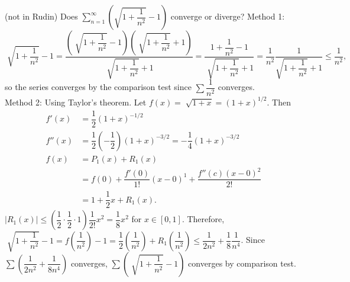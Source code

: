 \begin{example}
	(not in Rudin)
	Does $\sum_{n=1}^{\infty}{\left( \sqrt{1+\dfrac{1}{n^2}}-1 \right)}$ converge or diverge?
	Method 1:
	\[
		\sqrt[]{1+\dfrac{1}{n^2}}-1=\dfrac{\left(\sqrt[]{1+\dfrac{1}{n^2}}-1\right)\left(\sqrt[]{1+\dfrac{1}{n^2}}+1\right)}{\sqrt[]{1+\dfrac{1}{n^2}}+1}
		=\dfrac{1+\dfrac{1}{n^2}-1}{\sqrt[]{1+\dfrac{1}{n^2}}+1}=\dfrac{1}{n^2}\dfrac{1}{\sqrt{1+\dfrac{1}{n^2}}+1}\le \dfrac{1}{n^2}
		,\] so the series converges by the comparison test since $\sum{\dfrac{1}{n^2}}$ converges.\\
	Method 2: Using Taylor's theorem. Let $f(x)=\sqrt[]{1+x}=(1+x)^{1/2}$. Then
	\begin{align*}
		f'(x)  & =\dfrac{1}{2}(1+x)^{-1/2}                                            \\
		f''(x) & =\dfrac{1}{2}(-\dfrac{1}{2})(1+x)^{-3/2}  =-\dfrac{1}{4}(1+x)^{-3/2} \\
		f(x)   & =P_1(x)+R_1(x)                                                       \\
		       & =f(0)+\dfrac{f'(0)}{1!}(x-0)^{1}+\dfrac{f''(c)(x-0)^{2}}{2!}         \\
		       & =1+\dfrac{1}{2}x+R_1(x)
		.\end{align*}
$|R_1(x)|\le (\dfrac{1}{2}\cdot \dfrac{1}{2}\cdot 1)\dfrac{1}{2!}x^{2}=\dfrac{1}{8}x^2$ for $x \in [0,1]$.
	Therefore, $\sqrt[]{1+\dfrac{1}{n^2}}-1=f(\dfrac{1}{n^2})-1=\dfrac{1}{2}(\dfrac{1}{n^2})+R_1(\dfrac{1}{n^2})\le \dfrac{1}{2n^2}+\dfrac{1}{8}\dfrac{1}{n^{4}}$.
	Since $\sum{\left(\dfrac{1}{2n^2} +\dfrac{1}{8n^{4}}\right)}$ converges, $\sum{\left(\sqrt[]{ 1+\dfrac{1}{n^2}}-1 \right)}$  converges by comparison test.
\end{example}
